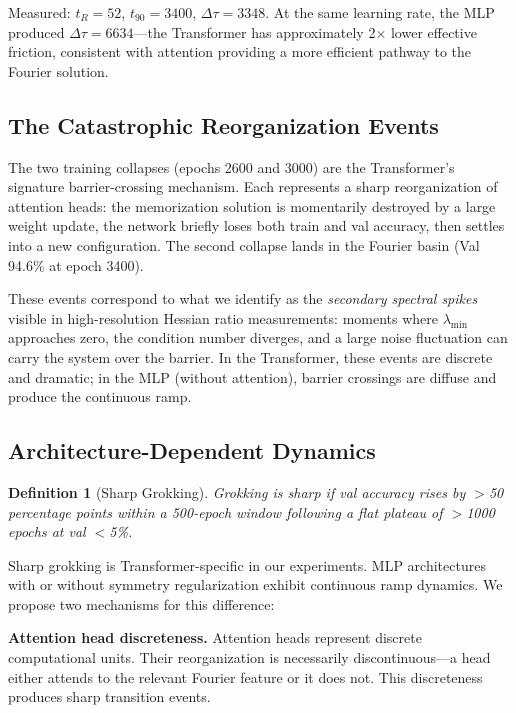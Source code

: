 \documentclass[11pt,twocolumn]{article}
\newtheorem{definition}{Definition}
\begin{document}
Measured: $t_R = 52$, $t_{90} = 3400$, $\Delta\tau = 3348$. At the same learning rate, the MLP produced $\Delta\tau = 6634$---the Transformer has approximately 2$\times$ lower effective friction, consistent with attention providing a more efficient pathway to the Fourier solution.

\subsection{The Catastrophic Reorganization Events}

The two training collapses (epochs 2600 and 3000) are the Transformer's signature barrier-crossing mechanism. Each represents a sharp reorganization of attention heads: the memorization solution is momentarily destroyed by a large weight update, the network briefly loses both train and val accuracy, then settles into a new configuration. The second collapse lands in the Fourier basin (Val 94.6\% at epoch 3400).

These events correspond to what we identify as the \emph{secondary spectral spikes} visible in high-resolution Hessian ratio measurements: moments where $\lambda_{\min}$ approaches zero, the condition number diverges, and a large noise fluctuation can carry the system over the barrier. In the Transformer, these events are discrete and dramatic; in the MLP (without attention), barrier crossings are diffuse and produce the continuous ramp.

\subsection{Architecture-Dependent Dynamics}

\begin{definition}[Sharp Grokking]
Grokking is \emph{sharp} if val accuracy rises by $>$50 percentage points within a 500-epoch window following a flat plateau of $>$1000 epochs at val $<$5\%.
\end{definition}

Sharp grokking is Transformer-specific in our experiments. MLP architectures with or without symmetry regularization exhibit continuous ramp dynamics. We propose two mechanisms for this difference:

\textbf{Attention head discreteness.} Attention heads represent discrete computational units. Their reorganization is necessarily discontinuous---a head either attends to the relevant Fourier feature or it does not. This discreteness produces sharp transition events.
\end{document}
